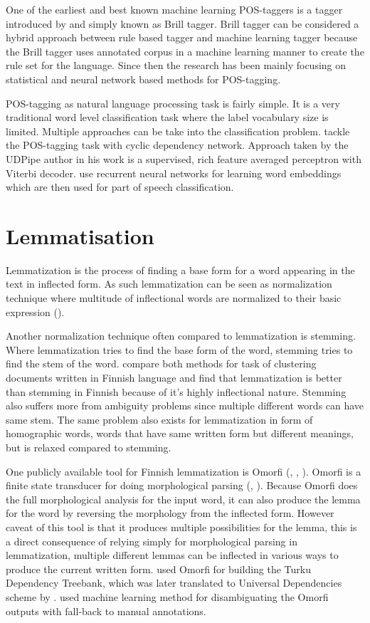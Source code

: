 \documentclass[12pt,a4paper,english
]{tutthesis}
\begin{document}
One of the earliest and best known machine learning POS-taggers is a tagger introduced by \cite{Brill1992} and simply known as Brill tagger. Brill tagger can be considered a hybrid approach between rule based tagger and machine learning tagger because the Brill tagger uses annotated corpus in a machine learning manner to create the rule set for the language. Since then the research has been mainly focusing on statistical and neural network based methods for POS-tagging.

POS-tagging as natural language processing task is fairly simple. It is a very traditional word level classification task where the label vocabulary size is limited. Multiple approaches can be take into the classification problem. \cite{Toutanova2003} tackle the POS-tagging task with cyclic dependency network. Approach taken by the UDPipe author \cite{Straka2016} in his work is a supervised, rich feature averaged perceptron with Viterbi decoder. \cite{Ling2015} use recurrent neural networks for learning word embeddings which are then used for part of speech classification.

\section{Lemmatisation}
\label{se:lemmatisation}
Lemmatization is the process of finding a base form for a word appearing in the text in inflected form. As such lemmatization can be seen as normalization technique where multitude of inflectional words are normalized to their basic expression (\cite{Korenius2004}).

Another normalization technique often compared to lemmatization is stemming. Where lemmatization tries to find the base form of the word, stemming tries to find the stem of the word. \cite{Korenius2004} compare both methods for task of clustering documents written in Finnish language and find that lemmatization is better than stemming in Finnish because of it's highly inflectional nature. Stemming also suffers more from ambiguity problems since multiple different words can have same stem. The same problem also exists for lemmatization in form of homographic words, words that have same written form but different meanings, but is relaxed compared to stemming.

One publicly available tool for Finnish lemmatization is Omorfi (\cite{Pirinen2008}, \cite{Linden2009}, \cite{omorfi}). Omorfi is a finite state transducer for doing morphological parsing (\cite{Pirinen2008}, \cite{Linden2009}). Because Omorfi does the full morphological analysis for the input word, it can also produce the lemma for the word by reversing the morphology from the inflected form. However caveat of this tool is that it produces multiple possibilities for the lemma, this is a direct consequence of relying simply for morphological parsing in lemmatization, multiple different lemmas can be inflected in various ways to produce the current written form. \cite{Haverinen2014} used Omorfi for building the Turku Dependency Treebank, which was later translated to Universal Dependencies scheme by \cite{Pyysalo2015}. \cite{Haverinen2014} used machine learning method for disambiguating the Omorfi outputs with fall-back to manual annotations.
\end{document}
